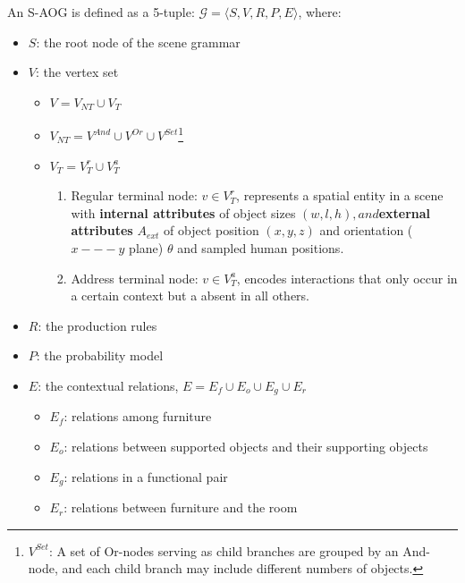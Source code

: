 \documentclass[10pt]{article}
\begin{document}
An S-AOG is defined as a 5-tuple: $\mathcal{G} = \langle S, V, R, P, E \rangle$,
where:
%
\begin{itemize}
  \item $S$: the root node of the scene grammar
  \item $V$: the vertex set
    \begin{itemize}
      \item $V = V_{NT} \cup V_T$
      \item $V_{NT} = V^{And} \cup V^{Or} \cup V^{Set}$\footnote{$V^{Set}$: A
          set of Or-nodes serving as child branches are grouped by an And-node,
          and each child branch may include different numbers of objects.}
      \item $V_T = V^r_T \cup V^a_T$
        \begin{enumerate}
          \item Regular terminal node: $v \in V^r_T$, represents a spatial
            entity in a scene with \textbf{internal attributes} of object sizes
            $(w, l, h), and $\textbf{external attributes} $A_{ext}$ of
            object position $(x, y, z)$ and orientation ($x --- y$ plane)
            $\theta$ and sampled human positions.
          \item Address terminal node: $v \in V^a_T$, encodes interactions that
            only occur in a certain context but a absent in all others.
        \end{enumerate}
    \end{itemize}
  \item $R$: the production rules
  \item $P$: the probability model
  \item $E$: the contextual relations, $E = E_f \cup E_o \cup E_g \cup E_r$
    \begin{itemize}
      \item $E_f$: relations among furniture
      \item $E_o$: relations between supported objects and their supporting
        objects
      \item $E_g$: relations in a functional pair
      \item $E_r$: relations between furniture and the room
    \end{itemize}
\end{itemize}
\end{document}
